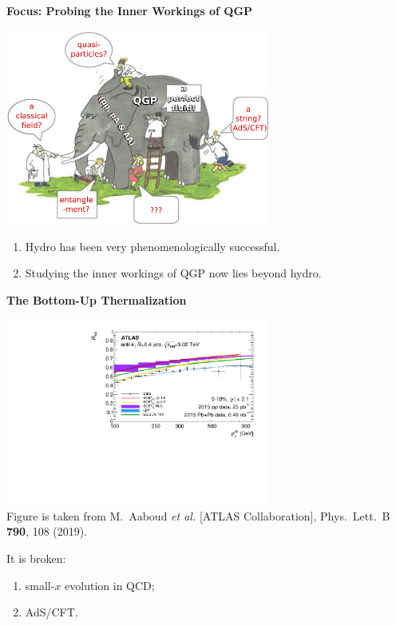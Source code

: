 \documentclass[9pt,a4paper,unknownkeysallowed,xcolor=dvipsnames,aspectratio=43]{beamer}
\begin{document}
\begin{frame}{\bf\huge Focus: Probing the Inner Workings of QGP}	\vspace{4mm}
\setcounter{page}{1}
\begin{center}
\includegraphics[width=0.65\textwidth]{fig/beyondhydro}
\vspace{4mm}
\begin{enumerate}
\item {Hydro has been very phenomenologically successful.}
\vspace{4mm}
\item {\color{darkred} Studying the inner workings of QGP now lies beyond hydro.}
\end{enumerate}
\end{center}
\end{frame}

%
%
\setcounter{page}{5}
\begin{frame}{\bf\huge The Bottom-Up Thermalization}	\vspace{4mm}
\begin{center}
\includegraphics[width=0.65\textwidth]{fig/RAA_jet}\\
{\tiny  Figure is taken from {\color{teablue}
M.~Aaboud {\it et al.} [ATLAS Collaboration],
  Phys.\ Lett.\ B {\bf 790}, 108 (2019).
  }}
\end{center}
\vspace{4mm}
{\large It is broken:}
\vspace{2mm}
\begin{enumerate}
\item{small-$x$ evolution in QCD;}
\vspace{4mm}
\item{AdS/CFT.}
\end{enumerate}
\end{frame}
\end{document}
